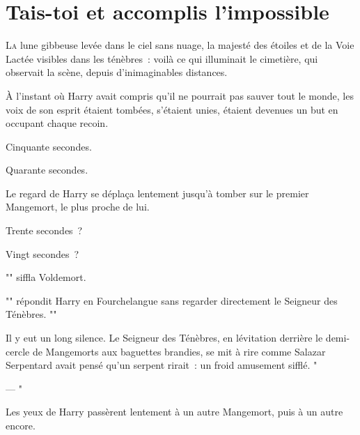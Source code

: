 \chapter{Tais-toi et accomplis l'impossible}

\lettrine{L}{a} lune gibbeuse levée dans le ciel sans nuage, la majesté des étoiles et de la Voie Lactée visibles dans les ténèbres~: voilà ce qui illuminait le cimetière, qui observait la scène, depuis d'inimaginables distances.

À l'instant où Harry avait compris qu'il ne pourrait pas sauver tout le monde, les voix de son esprit étaient tombées, s'étaient unies, étaient devenues un but en occupant chaque recoin.

Cinquante secondes.

Quarante secondes.

Le regard de Harry se déplaça lentement jusqu'à tomber sur le premier Mangemort, le plus proche de lui.

Trente secondes~?

Vingt secondes~?

"" siffla Voldemort.

"" répondit Harry en Fourchelangue sans regarder directement le Seigneur des Ténèbres. ""

Il y eut un long silence. Le Seigneur des Ténèbres, en lévitation derrière le demi-cercle de Mangemorts aux baguettes brandies, se mit à rire comme Salazar Serpentard avait pensé qu'un serpent rirait~: un froid amusement sifflé. "

--- "

Les yeux de Harry passèrent lentement à un autre Mangemort, puis à un autre encore.

